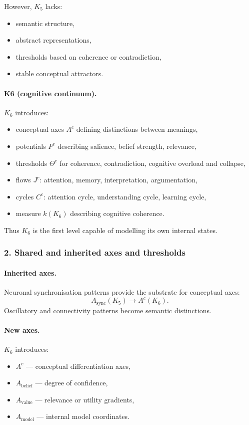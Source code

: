 However, $K_5$ lacks:
\begin{itemize}
  \item semantic structure,
  \item abstract representations,
  \item thresholds based on coherence or contradiction,
  \item stable conceptual attractors.
\end{itemize}

\paragraph{K6 (cognitive continuum).}
$K_6$ introduces:
\begin{itemize}
  \item conceptual axes $A^{c}$ defining distinctions between meanings,
  \item potentials $P^{c}$ describing salience, belief strength, relevance,
  \item thresholds $\Theta^{c}$ for coherence, contradiction,
        cognitive overload and collapse,
  \item flows $J^{c}$: attention, memory, interpretation, argumentation,
  \item cycles $C^{c}$: attention cycle, understanding cycle, learning cycle,
  \item measure $k(K_6)$ describing cognitive coherence.
\end{itemize}

Thus $K_6$ is the first level capable of modelling its own internal states.

\subsubsection{2. Shared and inherited axes and thresholds}

\paragraph{Inherited axes.}
Neuronal synchronisation patterns provide the substrate for conceptual axes:
\[
A_{\mathrm{sync}}(K_5) \rightarrow A^{c}(K_6).
\]
Oscillatory and connectivity patterns become semantic distinctions.

\paragraph{New axes.}
$K_6$ introduces:
\begin{itemize}
  \item $A^{c}$ — conceptual differentiation axes,
  \item $A_{\mathrm{belief}}$ — degree of confidence,
  \item $A_{\mathrm{value}}$ — relevance or utility gradients,
  \item $A_{\mathrm{model}}$ — internal model coordinates.
\end{itemize}

